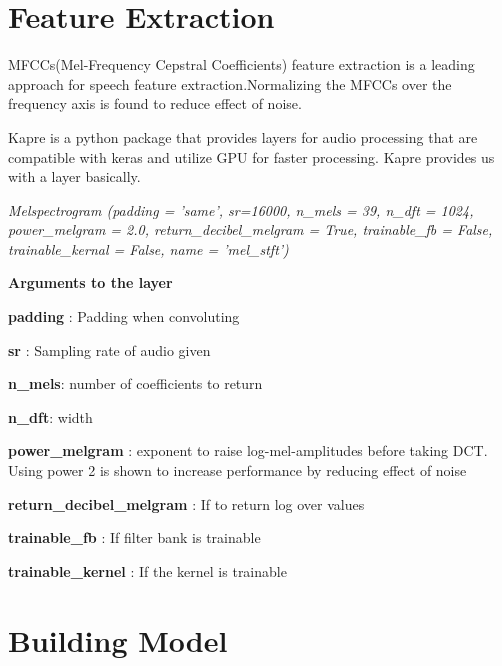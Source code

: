 \documentclass[11pt,english]{article}
\begin{document}
\section{Feature Extraction}
MFCCs(Mel-Frequency Cepstral Coefficients) feature extraction is a leading approach for speech feature extraction.Normalizing the MFCCs over the frequency axis is found to reduce effect of noise.

Kapre is a python package that provides layers for audio processing that are compatible with keras and utilize GPU for faster processing. Kapre provides us with a layer basically.

\emph{Melspectrogram (padding = 'same', sr=16000, n\_mels = 39, n\_dft = 1024, power\_melgram = 2.0, return\_decibel\_melgram = True, trainable\_fb = False, trainable\_kernal = False, name = 'mel\_stft')}

\textbf{Arguments to the layer}

\textbf{padding} : Padding when convoluting

\textbf{sr} : Sampling rate of audio given

\textbf{n\_mels}: number of coefficients to return

\textbf{n\_dft}: width 

\textbf{power\_melgram} : exponent to raise log-mel-amplitudes before taking DCT. Using power 2 is shown to increase performance by reducing effect of noise

\textbf{return\_decibel\_melgram} : If to return log over values

\textbf{trainable\_fb} : If filter bank is trainable

\textbf{trainable\_kernel} : If the kernel is trainable

\section{Building Model}
\end{document}
